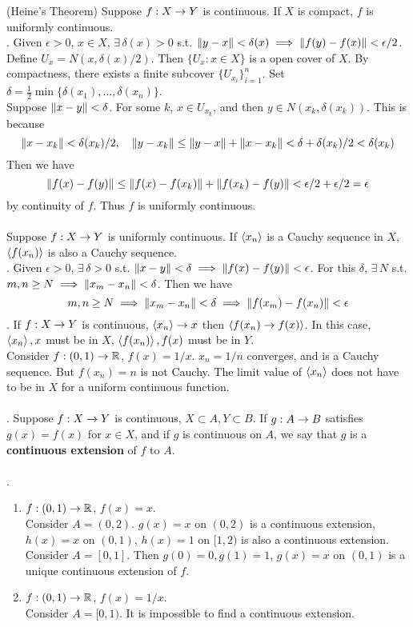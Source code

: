  (Heine's Theorem) Suppose $f:X\rightarrow Y$ is continuous. If $X$ is compact, $f$ is uniformly continuous.\\
\pf. Given $\epsilon > 0$, $x\in X$, $\exists\, \delta(x)>0$ s.t. $\left\lVert y-x\right\rVert < \delta(x) \implies \left\lVert f(y) - f(x)\right\rVert < \epsilon / 2$. \\
Define $U_x = N(x, \delta(x) / 2)$. Then $\{U_x:x\in X\}$ is a open cover of $X$. By compactness, there exists a finite subcover $\{U_{x_i} \}_{i=1}^n$. Set $\delta =\frac{1}{2}\min \{\delta(x_1), \dots, \delta(x_n) \}$.\\
Suppose $\left\lVert x - y\right\rVert< \delta$. For some $k$, $x\in U_{x_k}$, and then $y\in N(x_k, \delta(x_k))$. This is because $$\left\lVert x - x_k\right\rVert < \delta(x_k) / 2, \quad \left\lVert y - x_k\right\rVert \leq \left\lVert y - x\right\rVert + \left\lVert x - x_k\right\rVert < \delta + \delta(x_k) / 2 < \delta(x_k)$$ Then we have $$\left\lVert f(x) - f(y)\right\rVert \leq \left\lVert f(x) - f(x_k)\right\rVert + \left\lVert f(x_k) - f(y)\right\rVert < \epsilon / 2 + \epsilon/ 2 = \epsilon$$ by continuity of $f$. Thus $f$ is uniformly continuous.\\
\\
 Suppose $f:X\rightarrow Y$ is uniformly continuous. If $\left\langle x_n \right\rangle$ is a Cauchy sequence in $X$, $\left\langle f(x_n) \right\rangle$ is also a Cauchy sequence.\\
\pf. Given $\epsilon > 0$, $\exists\,\delta >0$ s.t. $\left\lVert x - y\right\rVert < \delta \implies \left\lVert f(x) - f(y)\right\rVert < \epsilon$. For this $\delta$, $\exists\,N$ s.t. $m, n\geq N\implies \left\lVert x_m-x_n\right\rVert < \delta$. Then we have $$m, n\geq N \implies \left\lVert x_m-x_n\right\rVert < \delta \implies \left\lVert f(x_m) - f(x_n)\right\rVert < \epsilon$$
\rmk. If $f:X\rightarrow Y$ is continuous, $\left\langle x_n \right\rangle \rightarrow x$ then $\left\langle f(x_n) \rightarrow f(x) \right\rangle$. In this case, $\left\langle x_n \right\rangle, x$ must be in $X$, $\left\langle f(x_n) \right\rangle, f(x)$ must be in $Y$.\\
Consider $f:(0, 1)\rightarrow \mathbb{R}$, $f(x) = 1/x$. $x_n = 1/n$ converges, and is a Cauchy sequence. But $f(x_n) = n$ is not Cauchy. The limit value of $\left\langle x_n \right\rangle$ does not have to be in $X$ for a uniform continuous function.\\
\\
. Suppose $f:X\rightarrow Y$ is continuous, $X\subset A, Y\subset B$. If $g:A\rightarrow B$ satisfies $g(x) = f(x)$ for $x\in X$, and if $g$ is continuous on $A$, we say that $g$ is a \textbf{continuous extension} of $f$ to $ A $.\\
\\
\ex.
\begin{enumerate}
	\item $f:(0, 1)\rightarrow \mathbb{R}$, $f(x) = x$.\\
	Consider $A = (0, 2)$. $g(x) = x$ on $(0, 2)$ is a continuous extension, $h(x) = x$ on $(0, 1)$, $h(x) = 1$ on $[1,2)$ is also a continuous extension.\\
	Consider $A = [0 ,1]$. Then $g(0) = 0, g(1)=1$, $g(x) = x$ on $(0, 1)$ is a unique continuous extension of $f$.
	\item $f:(0, 1)\rightarrow\mathbb{R}$, $f(x) = 1/x $.\\
	Consider $A = [0, 1)$. It is impossible to find a continuous extension.
\end{enumerate}~\\
